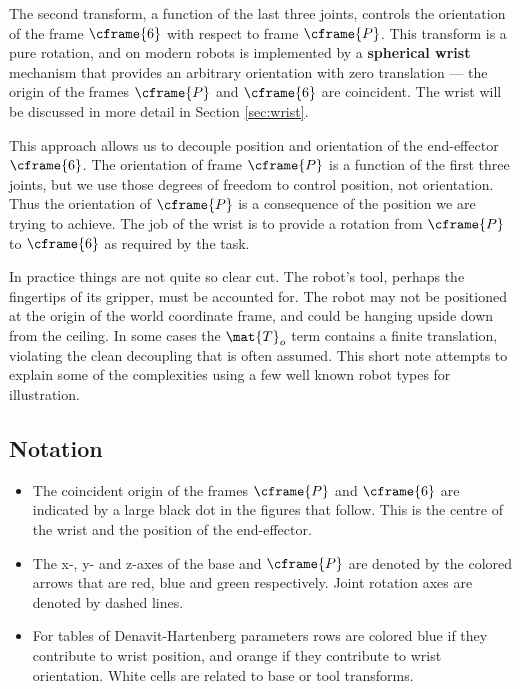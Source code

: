 \documentclass[11pt]{article}
\numberwithin{equation}{section}
\begin{document}
The second transform, a function of the last three joints, controls the orientation of the frame $\cframe{6}$ with respect to frame
$\cframe{P}$.  This transform is a pure rotation, and on modern robots is implemented by  a \textbf{spherical wrist} mechanism that provides an arbitrary orientation with zero translation --- the origin of the frames
$\cframe{P}$ and $\cframe{6}$ are coincident.
The wrist will be discussed in more detail in Section \ref{sec:wrist}.

This  approach allows us to decouple position and orientation of the end-effector $\cframe{6}$. 
The orientation of frame $\cframe{P}$ is a function of the first three joints, but we use those degrees of freedom to control position, not orientation.  Thus the orientation of $\cframe{P}$ is a consequence of the position we are trying to achieve.  The job of the wrist is to provide a rotation from
$\cframe{P}$ to $\cframe{6}$ as required by the task.

In practice things are not quite so clear cut.  The robot's tool, perhaps the fingertips of its gripper, must be accounted for.  The robot may not be positioned
at the origin of the world coordinate frame, and could be hanging upside down from the ceiling.
In some cases the $\mat{T}_o$ term contains a finite translation, violating the clean decoupling that is often assumed.
This short note attempts to explain some of the complexities using a few well known robot types for illustration.

\subsection*{Notation}
\begin{itemize}
\item The coincident origin of the frames
$\cframe{P}$ and $\cframe{6}$ are  indicated by a large black dot in the figures that follow.  This is the centre of the wrist and the position
of the end-effector.
\item 
The x-, y- and z-axes of the base and $\cframe{P}$ are denoted by the colored
arrows that are red, blue and green respectively.  Joint rotation axes are denoted by dashed lines.

\item For tables of Denavit-Hartenberg parameters rows are colored blue if they contribute to wrist position, and orange if they
contribute to wrist orientation.  White cells are related to base or tool transforms.
\end{itemize}
\pagebreak
\end{document}
